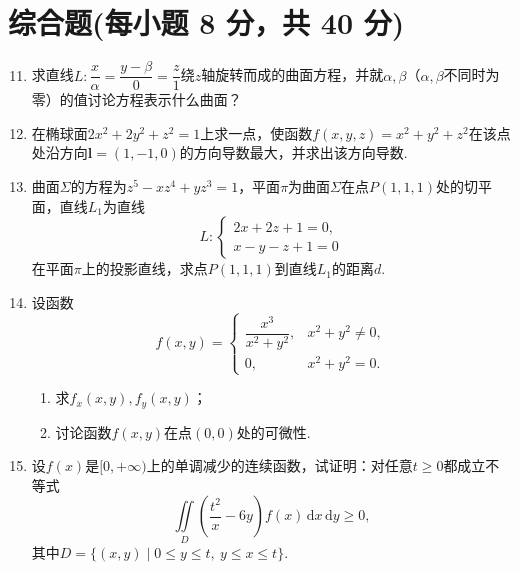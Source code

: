 \documentclass[../main.tex]{subfiles}
\begin{document}
\section{综合题(每小题 8 分，共 40 分)}
\begin{enumerate}
    \setcounter{enumi}{10}
    \item 求直线$L:\dfrac{x}{\alpha}=\dfrac{y-\beta}{0}=\dfrac{z}{1}$绕$z$轴旋转而成的曲面方程，并就$\alpha,\beta$（$\alpha,\beta$不同时为零）的值讨论方程表示什么曲面？
          \vspace{12em}

    \item 在椭球面$2x^2+2y^2+z^2=1$上求一点，使函数$f(x,y,z)=x^2+y^2+z^2$在该点处沿方向$\boldsymbol{l}=(1,-1,0)$的方向导数最大，并求出该方向导数.
          \vspace{12em}

    \item 曲面$\Sigma$的方程为$z^5-xz^4+yz^3=1$，平面$\pi$为曲面$\Sigma$在点$P(1,1,1)$处的切平面，直线$L_1$为直线
          \[
              L:\begin{cases}
                  2x+2z+1=0, \\
                  x-y-z+1=0
              \end{cases}
          \]
          在平面$\pi$上的投影直线，求点$P(1,1,1)$到直线$L_1$的距离$d$.
          \vspace{13em}

    \item 设函数
          \[
              f(x,y)=
              \begin{cases}
                  \dfrac{x^3}{x^2+y^2}, & x^2+y^2\ne0, \\[0.6em]
                  0,                    & x^2+y^2=0.
              \end{cases}
          \]
          \begin{enumerate}[label=(\arabic*)]
              \item 求$f_x(x,y),f_y(x,y)$；
              \item 讨论函数$f(x,y)$在点$(0,0)$处的可微性.
          \end{enumerate}
          \vspace{12em}

    \item 设$f(x)$是$[0,+\infty)$上的单调减少的连续函数，试证明：对任意$t\ge0$都成立不等式
          \[
              \iint\limits_D\left(\frac{t^2}{x}-6y\right)f(x)\,\mathrm{d}x\,\mathrm{d}y\ge0,
          \]
          其中$D=\{(x,y)\mid0\le y\le t,\ y\le x\le t\}$.
          \vspace{12em}
\end{enumerate}
\end{document}
